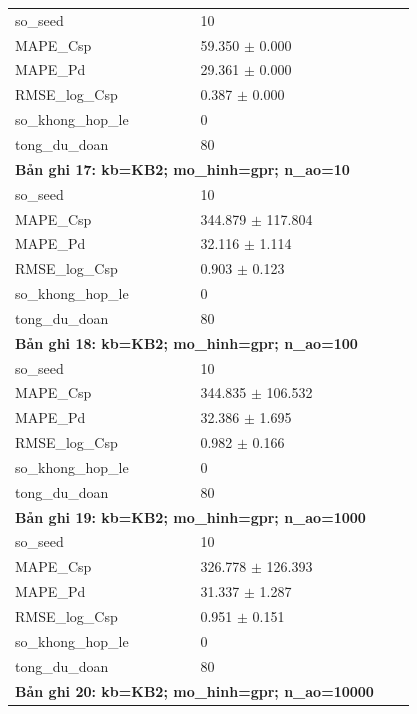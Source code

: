 \begin{longtable}{p{0.43\linewidth}p{0.50\linewidth}}
so\_\allowbreak seed & 10 \\
MAPE\_\allowbreak Csp & 59.350 $\pm$ 0.000 \\
MAPE\_\allowbreak Pd & 29.361 $\pm$ 0.000 \\
RMSE\_\allowbreak log\_\allowbreak Csp & 0.387 $\pm$ 0.000 \\
so\_\allowbreak khong\_\allowbreak hop\_\allowbreak le & 0 \\
tong\_\allowbreak du\_\allowbreak doan & 80 \\
\midrule
\multicolumn{2}{p{0.95\linewidth}}{\textbf{Bản ghi 17: kb=KB2; mo\_hinh=gpr; n\_ao=10}} \\
so\_\allowbreak seed & 10 \\
MAPE\_\allowbreak Csp & 344.879 $\pm$ 117.804 \\
MAPE\_\allowbreak Pd & 32.116 $\pm$ 1.114 \\
RMSE\_\allowbreak log\_\allowbreak Csp & 0.903 $\pm$ 0.123 \\
so\_\allowbreak khong\_\allowbreak hop\_\allowbreak le & 0 \\
tong\_\allowbreak du\_\allowbreak doan & 80 \\
\midrule
\multicolumn{2}{p{0.95\linewidth}}{\textbf{Bản ghi 18: kb=KB2; mo\_hinh=gpr; n\_ao=100}} \\
so\_\allowbreak seed & 10 \\
MAPE\_\allowbreak Csp & 344.835 $\pm$ 106.532 \\
MAPE\_\allowbreak Pd & 32.386 $\pm$ 1.695 \\
RMSE\_\allowbreak log\_\allowbreak Csp & 0.982 $\pm$ 0.166 \\
so\_\allowbreak khong\_\allowbreak hop\_\allowbreak le & 0 \\
tong\_\allowbreak du\_\allowbreak doan & 80 \\
\midrule
\multicolumn{2}{p{0.95\linewidth}}{\textbf{Bản ghi 19: kb=KB2; mo\_hinh=gpr; n\_ao=1000}} \\
so\_\allowbreak seed & 10 \\
MAPE\_\allowbreak Csp & 326.778 $\pm$ 126.393 \\
MAPE\_\allowbreak Pd & 31.337 $\pm$ 1.287 \\
RMSE\_\allowbreak log\_\allowbreak Csp & 0.951 $\pm$ 0.151 \\
so\_\allowbreak khong\_\allowbreak hop\_\allowbreak le & 0 \\
tong\_\allowbreak du\_\allowbreak doan & 80 \\
\midrule
\multicolumn{2}{p{0.95\linewidth}}{\textbf{Bản ghi 20: kb=KB2; mo\_hinh=gpr; n\_ao=10000}} \\

\end{longtable}
